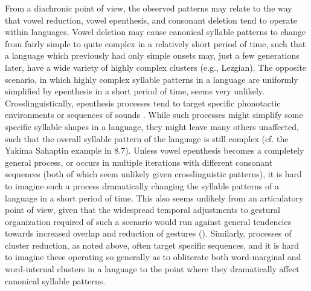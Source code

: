   From a diachronic point of view, the observed patterns may relate to the way that vowel reduction, vowel epenthesis, and consonant deletion tend to operate within languages. Vowel deletion may cause canonical syllable patterns to change from fairly simple to quite complex in a relatively short period of time, such that a language which previously had only simple onsets may, just a few generations later, have a wide variety of highly complex clusters (e.g., Lezgian). The opposite scenario, in which highly complex syllable patterns in a language are uniformly simplified by epenthesis in a short period of time, seems very unlikely. Crosslinguistically, epenthesis processes tend to target specific phonotactic environments or sequences of sounds \citep{Hall2011}. While such processes might simplify some specific syllable shapes in a language, they might leave many others unaffected, such that the overall syllable pattern of the language is still complex (cf. the Yakima Sahaptin example in 8.7). Unless vowel epenthesis becomes a completely general process, or occurs in multiple iterations with different consonant sequences (both of which seem unlikely given crosslinguistic patterns), it is hard to imagine such a process dramatically changing the syllable patterns of a language in a short period of time. This also seems unlikely from an articulatory point of view, given that the widespread temporal adjustments to gestural organization required of such a scenario would run against general tendencies towards increased overlap and reduction of gestures (\citealt{BrowmanGoldstein1992b}). Similarly, processes of cluster reduction, as noted above, often target specific sequences, and it is hard to imagine these operating so generally as to obliterate both word-marginal and word-internal clusters in a language to the point where they dramatically affect canonical syllable patterns. 



